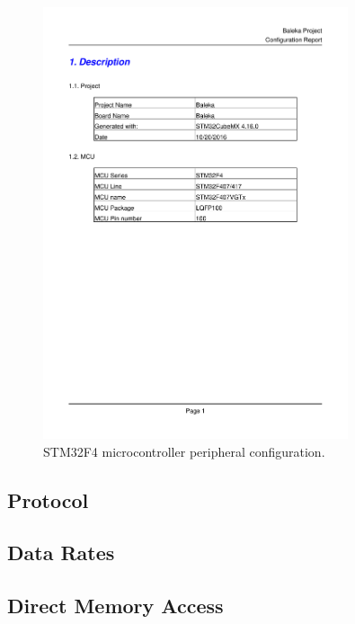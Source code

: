 \begin{figure}
\centering
\includegraphics[clip, trim=1cm 7cm 1cm 7cm, page = 2, width=0.8\textwidth]{pdfs/BalekaSTMConfig.pdf} 
\caption{STM32F4 microcontroller peripheral configuration.}
\label{fig:microcontroller-peripheral-config}
\end{figure}

\subsection{Protocol}
\subsection{Data Rates}
\subsection{Direct Memory Access}


